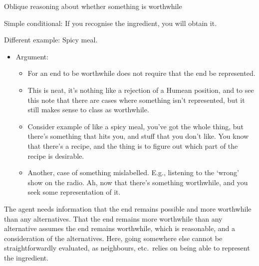 \documentclass[10pt]{article}
\begin{document}
Oblique reasoning about whether something is worthwhile




Simple conditional: If you recognise the ingredient, you will obtain it.

Different example: Spicy meal.


\begin{itemize}
\item Argument:
  \begin{itemize}
  \item For an end to be worthwhile does not require that the end be represented.
  \item This is neat, it's nothing like a rejection of a Humean position, and to see this note that there are cases where something isn't represented, but it still makes sense to class as worthwhile.
  \item Consider example of like a spicy meal, you've got the whole thing, but there's something that hits you, and stuff that you don't like.
    You know that there's a recipe, and the thing is to figure out which part of the recipe is desirable.
  \item Another, case of something mislabelled.
    E.g., listening to the `wrong' show on the radio.
    Ah, now that there's something worthwhile, and you seek some representation of it.
  \end{itemize}
\end{itemize}






The agent needs information that the end remains possible and more worthwhile than any alternatives.
That the end remains more worthwhile than any alternative assumes the end remains worthwhile, which is reasonable, and a consideration of the alternatives.
Here, going somewhere else cannot be straightforwardly evaluated, as neighbours, etc.\ relies on being able to represent the ingredient.



\vfill
\end{document}
